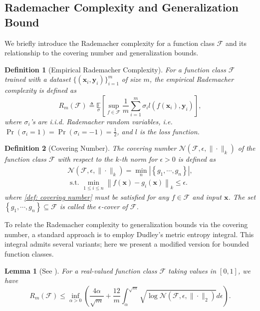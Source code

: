 \documentclass[lettersize,onecolumn]{IEEEtran}
\newtheorem{lemma}{Lemma}
\newtheorem{definition}{Definition}
\begin{document}
\subsection{Rademacher Complexity and Generalization Bound}

We briefly introduce the Rademacher complexity for a function class $\mathcal{F}$ and its relationship to the covering number and generalization bounds.

\begin{definition}[Empirical Rademacher Complexity]
    For a function class $\mathcal{F}$ trained with a dataset $\{(\mathbf{x}_i,\mathbf{y}_i)\}_{i=1}^{m}$ of size $m$, the empirical Rademacher complexity is defined as
    \begin{equation}
        R_{m}\left(\mathcal{F}\right) \triangleq \underset{\sigma}{\mathbb{E}}\left[\sup _{f \in \mathcal{F}} \frac{1}{m} \sum_{i=1}^{m} \sigma_{i} l\left(f\left(\mathbf{x}_{i}\right), \mathbf{y}_{i}\right)\right],
    \end{equation}
    where $\sigma_{i}$'s are i.i.d. Rademacher random variables, i.e. $\operatorname{Pr}\left(\sigma_{i}=1\right)=\operatorname{Pr}\left(\sigma_{i}=-1\right)=\frac{1}{2}$, and $l$ is the loss function.
\end{definition}

\begin{definition}[Covering Number]
      The covering number $\mathcal{N}\left(\mathcal{F}, \epsilon,\|\cdot\|_{k}\right)$ of the function class $\mathcal{F}$ with respect to the $k$-th norm for $\epsilon>0$ is defined as
     \begin{gather} 
        \mathcal{N}\left(\mathcal{F}, \epsilon,\|\cdot\|_{k}\right)=\min _{n}\left|\left\{g_{1}, \cdots, g_{n}\right\}\right|,  \\
        \text { s.t. } \min _{1 \leq i \leq n}\left\|f(\mathbf{x})-g_{i}(\mathbf{x})\right\|_{k} \leq \epsilon . \label{def: covering number}
     \end{gather}
     where \eqref{def: covering number} must be satisfied for any $f \in \mathcal{F}$ and input $\mathbf{x}$. The set $\left\{g_{1}, \cdots, g_{n}\right\} \subseteq \mathcal{F}$ is called the $\epsilon$-cover of $\mathcal{F}$.
\end{definition}

To relate the Rademacher complexity to generalization bounds via the covering number, a standard approach is to employ Dudley’s metric entropy integral. This integral admits several variants; here we present a modified version for bounded function classes.
\begin{lemma}[See \cite{bartlett2017spectrallynormalizedmarginbounds}]
For a real-valued function class $\mathcal{F}$ taking values in $[0,1]$, we have
    \begin{equation}
        R_{m}(\mathcal{F}) \leq \inf_{\alpha>0}\left(\frac{4 \alpha}{\sqrt{m}}+\frac{12}{m} \int_{\alpha}^{\sqrt{m}} \sqrt{\log \mathcal{N}\left(\mathcal{F}, \epsilon,\|\cdot \|_{2} \right)}d \epsilon\right).
        \label{eq: Rademacher by Dudley inter bound in PRELIMINARIES}
    \end{equation}
\end{lemma}
\end{document}
